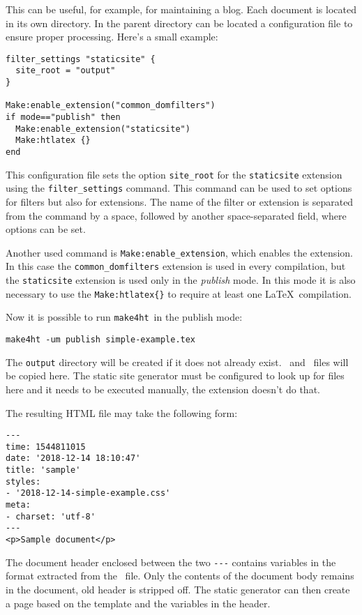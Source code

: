\documentclass{ltugproc}
\newcommand\term[1]{\textit{#1}}
\newcommand\command[1]{\texttt{#1}}
\newcommand\makefourht{\command{make4ht}}
\newcommand\mkextension[1]{\texttt{#1}}
\begin{document}
This can be useful, for example, for maintaining a blog.
Each document is located in its own directory. In the parent directory
can be located a configuration file to ensure proper processing. Here's a small
example: 

\begin{verbatim}
filter_settings "staticsite" {
  site_root = "output" 
}

Make:enable_extension("common_domfilters")
if mode=="publish" then
  Make:enable_extension("staticsite")
  Make:htlatex {}
end

\end{verbatim}

This configuration file sets the option \verb|site_root| for the
\mkextension{staticsite} extension using the \texttt{fil\-ter\-\_\-set\-tings}
command.  This command can be used to set options for filters but also for
extensions.
The name of the filter or extension is separated from the command by a space,
followed by another space-separated field, where options can be set.

Another used command is \texttt{Make:\-enable\-\_\-ex\-ten\-sion}, which enables the
extension. In this case the \verb|common_domfilters| extension is used in every
compilation, but the \mkextension{staticsite} extension is used only in the  \term{publish}
mode. In this mode it is also necessary to use the \verb|Make:htlatex{}| to
require at least one \LaTeX\ compilation.

Now it is possible to run \makefourht\ in the publish mode:


\begin{verbatim}
make4ht -um publish simple-example.tex
\end{verbatim}

The \texttt{output} directory will be created if it does not already exist. \HTML\ and \CSS\ files will be copied here. The static site generator must be configured to look up for files here and it needs to be executed manually, the extension doesn't do that. 

The resulting HTML file may take the following form: 


\begin{verbatim}
---
time: 1544811015
date: '2018-12-14 18:10:47'
title: 'sample'
styles:
- '2018-12-14-simple-example.css'
meta:
- charset: 'utf-8'
---
<p>Sample document</p>
\end{verbatim}

The document header enclosed between the two \verb|---| contains variables in the 
format extracted from the \HTML\ file. Only the contents of the document body
remains in the document, old header is stripped off. The
static generator can then create a page based on the template and the variables
in the   header.
\end{document}

